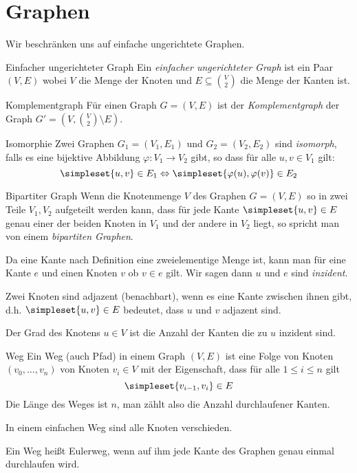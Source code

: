 \chapter{Graphen}
Wir beschränken uns auf einfache ungerichtete Graphen.
\begin{definition}{Einfacher ungerichteter Graph}
	Ein \emph{einfacher ungerichteter Graph} ist ein Paar $(V,E)$ wobei $V$ die Menge der Knoten und $E\subseteq \binom V2$ die Menge der Kanten ist.
\end{definition}

\begin{definition}{Komplementgraph}
	Für einen Graph $G=(V,E)$ ist der \emph{Komplementgraph} der Graph $G'=\left(V,\binom V2\setminus E\right)$.
\end{definition}

\begin{definition}{Isomorphie}
	Zwei Graphen $G_1=(V_1,E_1)$ und $G_2=(V_2,E_2)$ sind \emph{isomorph}, falls es eine bijektive Abbildung $\varphi:V_1\rightarrow V_2$ gibt, so dass für alle $u,v\in V_1$ gilt:
	\begin{equation*}
		\simpleset{u,v}\in E_1\Leftrightarrow \simpleset{\varphi(u),\varphi(v)}\in E_2
	\end{equation*}
\end{definition}

\begin{definition}{Bipartiter Graph}
	Wenn die Knotenmenge $V$ des Graphen $G=(V,E)$ so in zwei Teile $V_1,V_2$ aufgeteilt werden kann, dass für jede Kante $\simpleset{u,v}\in E$ genau einer der beiden Knoten in $V_1$ und der andere in $V_2$ liegt, so spricht man von einem \emph{bipartiten Graphen}.
\end{definition}

Da eine Kante nach Definition eine zweielementige Menge ist, kann man für eine Kante $e$ und einen Knoten $v$ ob $v\in e$ gilt. Wir sagen dann $u$ und $e$ sind \emph{inzident}.

Zwei Knoten sind adjazent (benachbart), wenn es eine Kante zwischen ihnen gibt, d.h. $\simpleset{u,v}\in E$ bedeutet, dass $u$ und $v$ adjazent sind.

Der Grad des Knotens $u\in V$ ist die Anzahl der Kanten die zu $u$ inzident sind.

\begin{definition}{Weg}
	Ein Weg (auch Pfad) in einem Graph $(V,E)$ ist eine Folge von Knoten $(v_0,\ldots,v_n)$ von Knoten $v_i\in V$ mit der Eigenschaft, dass für alle $1\leq i\leq n$ gilt
	\begin{equation*}
	 	\simpleset{v_{i-1},v_i}\in E
	\end{equation*}
	Die Länge des Weges ist $n$, man zählt also die Anzahl durchlaufener Kanten.

	In einem einfachen Weg sind alle Knoten verschieden. 
\end{definition}
Ein Weg heißt Eulerweg, wenn auf ihm jede Kante des Graphen genau einmal durchlaufen wird.



